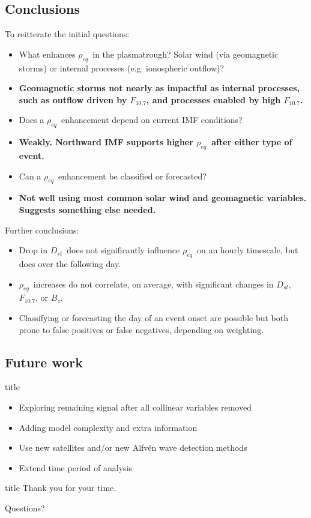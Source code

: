 \documentclass[xcolor={dvipsnames,table}]{beamer}
\newcommand{\subheader}{    		\begin{center}
  	\begin{beamercolorbox}[sep=4pt,center,shadow=true,rounded=true]{title}
  		\usebeamerfont{title}\subsecname\par%
  	\end{beamercolorbox}
  	\vfill
  	\end{center}}
\newcommand{\req}{\ensuremath{\rho_{eq}}} %
\newcommand{\dst}{\ensuremath{D_{st}}} %
\newcommand{\f}{\ensuremath{F_{10.7}}} %
\begin{document}
\subsection{Conclusions}
\begin{frame}
	To reitterate the initial questions:	
	\begin{itemize}
		\item What enhances \req\ in the plasmatrough? Solar wind (via geomagnetic storms) or internal processes (e.g. ionospheric outflow)?
		\item[] \textbf{Geomagnetic storms not nearly as impactful as internal processes, such as outflow driven by \f, and processes enabled by high \f.}
		\item Does a \req\ enhancement depend on current IMF conditions?
		\item[] \textbf{Weakly. Northward IMF supports higher \req\ after either type of event.}
		\item Can a \req\ enhancement be classified or forecasted?
		\item[] \textbf{Not well using most common solar wind and geomagnetic variables. Suggests something else needed.}
	\end{itemize}
\end{frame}

\begin{frame}
	Further conclusions:
	\begin{itemize}
		\item Drop in \dst\ does not significantly influence \req\ on an hourly timescale, but does over the following day.
		\item \req\ increases do not correlate, on average, with significant changes in \dst, \f, or $B_z$.
		\item Classifying or forecasting the day of an event onset are possible but both prone to false positives or false negatives, depending on weighting.
	\end{itemize}
\end{frame}


\subsection{Future work}
\begin{frame}
	\subheader
	\begin{itemize}
		\item Exploring remaining signal after all collinear variables removed
		\item Adding model complexity and extra information
		\item Use new satellites and/or new Alfvén wave detection methods
		\item Extend time period of analysis
	\end{itemize}
\end{frame}


\begin{frame}[c]
	\begin{center}
		\huge
		\begin{beamercolorbox}[sep=18pt,center,shadow=true,rounded=true]{title}
			Thank you for your time.\par%
		\end{beamercolorbox}
		\vspace{2em}
		Questions?
	\end{center}

\end{frame}
\end{document}
